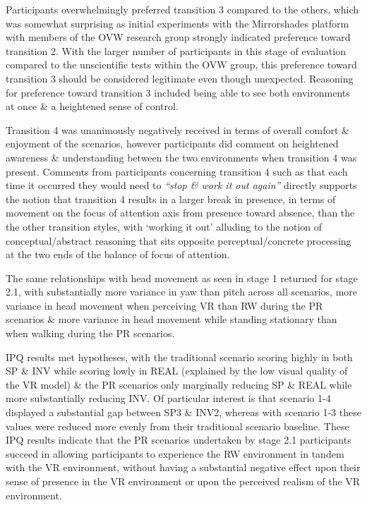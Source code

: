 Participants overwhelmingly preferred transition 3 compared to the others, which was somewhat surprising as initial experiments with the Mirrorshades platform with members of the OVW research group strongly indicated preference toward transition 2. With the larger number of participants in this stage of evaluation compared to the unscientific tests within the OVW group, this preference toward transition 3 should be considered legitimate even though unexpected. Reasoning for preference toward transition 3 included being able to see both environments at once \& a heightened sense of control.

Transition 4 was unanimously negatively received in terms of overall comfort \& enjoyment of the scenarios, however participants did comment on heightened awareness \& understanding between the two environments when transition 4 was present. Comments from participants concerning transition 4 such as that each time it occurred they would need to \textit{``stop \& work it out again''} directly supports the notion that transition 4 results in a larger break in presence, in terms of movement on the focus of attention axis from presence toward absence, than the the other transition styles, with `working it out' alluding to the notion of conceptual/abstract reasoning that sits opposite perceptual/concrete processing at the two ends of the balance of focus of attention.

The same relationships with head movement as seen in stage 1 returned for stage 2.1, with substantially more variance in yaw than pitch across all scenarios, more variance in head movement when perceiving VR than RW during the PR scenarios \& more variance in head movement while standing stationary than when walking during the PR scenarios.

IPQ results met hypotheses, with the traditional scenario scoring highly in both SP \& INV while scoring lowly in REAL (explained by the low visual quality of the VR model) \& the PR scenarios only marginally reducing SP \& REAL while more substantially reducing INV. Of particular interest is that scenario 1-4 displayed a substantial gap between SP3 \& INV2, whereas with scenario 1-3 these values were reduced more evenly from their traditional scenario baseline. These IPQ results indicate that the PR scenarios undertaken by stage 2.1 participants succeed in allowing participants to experience the RW environment in tandem with the VR environment, without having a substantial negative effect upon their sense of presence in the VR environment or upon the perceived realism of the VR environment.

